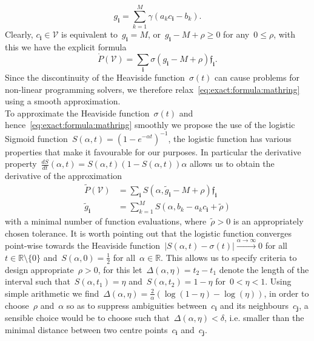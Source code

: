 \documentclass[letterpaper, 10pt, conference]{ieeeconf} %
\providecommand{\abs}[1]{\left\lvert#1\right\rvert}
\providecommand{\bfa}[1]{\mathbf{#1}}
\begin{document}
%
\begin{equation}
	g_\bfa{i} = \sum_{k=1}^M\gamma(a_k c_\bfa{i}-b_k).
\end{equation}
%
Clearly, $c_\bfa{i}\in\mathcal V$ is equivalent to~$g_\bfa{i}=M$, or~$g_\bfa{i}-M+\rho\geq0$ for any~$0\leq\rho$, with this we have the explicit formula
%
\begin{equation}\label{eq:exact:formula:mathring}
	\mathring{P}(\mathcal V) = \sum_{\bfa{i}}\sigma(g_\bfa{i}-M+\rho)\mathfrak f_\bfa{i}.
\end{equation}
%
Since the discontinuity of the Heaviside function~$\sigma(t)$ can cause problems for non-linear programming solvers, we therefore relax~\eqref{eq:exact:formula:mathring} using a smooth approximation.
%
\\[1em]
%
To approximate the Heaviside function~$\sigma(t)$ and hence~\eqref{eq:exact:formula:mathring} smoothly we propose the use of the logistic Sigmoid function~$S(\alpha,t) = (1-e^{-\alpha t})^{-1}$, the logistic function has various properties that make it favourable for our purposes.
%
In particular the derivative property~$\frac{dS}{dt}(\alpha,t)=S(\alpha,t)(1-S(\alpha,t))\alpha$ allows us to obtain the derivative of the approximation
%
\begin{equation}\label{eq:central:approximation:formula}
\begin{aligned}
\tilde{P}(\mathcal V) &= \sum_\bfa{i}S(\alpha,\tilde g_\bfa{i}-M+\rho)\mathfrak f_\bfa{i}\\
\tilde g_\bfa{i} &= \sum_{k=1}^M S(\alpha,b_k-a_k c_\bfa{i}+\tilde\rho)
\end{aligned}
\end{equation}
%
with a minimal number of function evaluations, where~$\tilde\rho>0$ is an appropriately chosen tolerance.
%
It is worth pointing out that the logistic function converges point-wise towards the Heaviside function~$\abs{S(\alpha,t)-\sigma(t)}\xrightarrow{\alpha\rightarrow\infty}0$ for all~$t\in\mathbb R\setminus\{0\}$ and~$S(\alpha,0)=\frac{1}{2}$ for all~$\alpha\in\mathbb R$.
%
This allows us to specify criteria to design appropriate~$\rho>0$, for this let~$\Delta(\alpha,\eta)=t_2-t_1$ denote the length of the interval such that~$S(\alpha,t_1)=\eta$ and~$S(\alpha,t_2)=1-\eta$ for~$0<\eta<1$.
%
Using simple arithmetic we find~$\Delta(\alpha,\eta)=\frac{2}{\alpha}(\log(1-\eta)-\log(\eta))$, in order to choose~$\rho$ and~$\alpha$ so as to suppress ambiguities between~$c_\bfa{i}$ and its neighbours~$c_\bfa{j}$, a sensible choice would be to choose such that~$\Delta(\alpha,\eta)<\delta$, i.e. smaller than the minimal distance between two centre points~$c_\bfa{i}$ and~$c_\bfa{j}$. 
\end{document}
